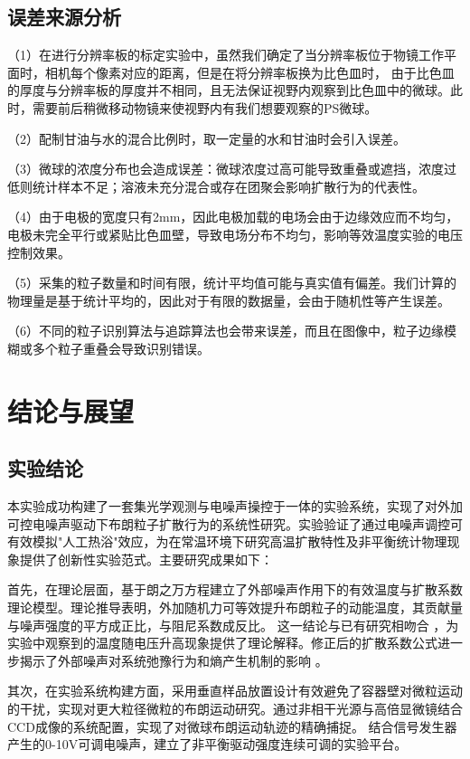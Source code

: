 \documentclass[a4paper]{report} %
\begin{document}
\section{误差来源分析}
（1）在进行分辨率板的标定实验中，虽然我们确定了当分辨率板位于物镜工作平面时，相机每个像素对应的距离，但是在将分辨率板换为比色皿时，
由于比色皿的厚度与分辨率板的厚度并不相同，且无法保证视野内观察到比色皿中的微球。此时，需要前后稍微移动物镜来使视野内有我们想要观察的PS微球。 \par
（2）配制甘油与水的混合比例时，取一定量的水和甘油时会引入误差。\par
（3）微球的浓度分布也会造成误差：微球浓度过高可能导致重叠或遮挡，浓度过低则统计样本不足；溶液未充分混合或存在团聚会影响扩散行为的代表性。\par
（4）由于电极的宽度只有2mm，因此电极加载的电场会由于边缘效应而不均匀，电极未完全平行或紧贴比色皿壁，导致电场分布不均匀，影响等效温度实验的电压控制效果。\par
（5）采集的粒子数量和时间有限，统计平均值可能与真实值有偏差。我们计算的物理量是基于统计平均的，因此对于有限的数据量，会由于随机性等产生误差。\par
（6）不同的粒子识别算法与追踪算法也会带来误差，而且在图像中，粒子边缘模糊或多个粒子重叠会导致识别错误。\par

\chapter{结论与展望}
\section{实验结论}
本实验成功构建了一套集光学观测与电噪声操控于一体的实验系统，实现了对外加可控电噪声驱动下布朗粒子扩散行为的系统性研究。实验验证了通过电噪声调控可有效模拟"人工热浴"效应，为在常温环境下研究高温扩散特性及非平衡统计物理现象提供了创新性实验范式。主要研究成果如下：

首先，在理论层面，基于朗之万方程建立了外部噪声作用下的有效温度与扩散系数理论模型。理论推导表明，外加随机力可等效提升布朗粒子的动能温度，其贡献量与噪声强度的平方成正比，与阻尼系数成反比。
这一结论与已有研究相吻合 \cite{Martinez2013,Roldan2014}，为实验中观察到的温度随电压升高现象提供了理论解释。修正后的扩散系数公式进一步揭示了外部噪声对系统弛豫行为和熵产生机制的影响 \cite{Leighton2024}。

其次，在实验系统构建方面，采用垂直样品放置设计有效避免了容器壁对微粒运动的干扰，实现对更大粒径微粒的布朗运动研究。通过非相干光源与高倍显微镜结合CCD成像的系统配置，实现了对微球布朗运动轨迹的精确捕捉。
结合信号发生器产生的0-10V可调电噪声，建立了非平衡驱动强度连续可调的实验平台。
\end{document}
